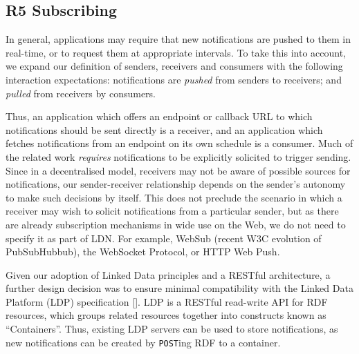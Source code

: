                             
                                \subsection{R5 Subscribing}
  \label{subscribing}

                                
                                    
\par In general, applications may require that new notifications are pushed to them in real-time, or to request them at appropriate intervals. To take this into account, we expand our definition of senders, receivers and consumers with the following interaction expectations: notifications are {\em pushed} from senders to receivers; and {\em pulled} from receivers by consumers.

                                    
\par Thus, an application which offers an endpoint or callback URL to which notifications should be sent directly is a receiver, and an application which fetches notifications from an endpoint on its own schedule is a consumer. Much of the related work {\em requires} notifications to be explicitly solicited to trigger sending. Since in a decentralised model, receivers may not be aware of possible sources for notifications, our sender-receiver relationship depends on the sender’s autonomy to make such decisions by itself. This does not preclude the scenario in which a receiver may wish to solicit notifications from a particular sender, but as there are already subscription mechanisms in wide use on the Web, we do not need to specify it as part of LDN. For example, \empty WebSub (recent W3C evolution of PubSubHubbub), the WebSocket Protocol, or HTTP Web Push.
                                
                            

                            
\par Given our adoption of Linked Data principles and a RESTful architecture, a further design decision was to ensure minimal compatibility with the \empty Linked Data Platform (LDP) specification []. LDP is a RESTful read-write API for RDF resources, which groups related resources together into constructs known as ``Containers''. Thus, existing LDP servers can be used to store notifications, as new notifications can be created by {\tt POST}ing RDF to a container.
                        
                    


